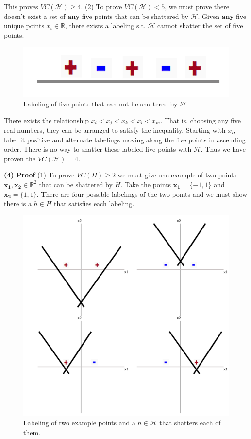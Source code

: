 \documentclass[11pt]{article}
\renewcommand\part[1]{\vspace{.10in}\textbf{(#1)}}
\begin{document}
This proves $VC(\mathcal{H}) \geq 4$. (2) To prove $VC(\mathcal{H}) < 5$, we must prove there doesn't exist a set of \textbf{any} five points that can be shattered by $\mathcal{H}$. Given \textbf{any} five unique points $x_i \in \mathbb{R}$, there exists a labeling s.t. $\mathcal{H}$ cannot shatter the set of five points.

\begin{figure}[H]
  \centerline{\includegraphics[width=0.5\linewidth]{image_2_3_2.png}}
  \caption{Labeling of five points that can not be shattered by $\mathcal{H}$}
\end{figure}

There exists the relationship $x_i < x_j < x_k < x_l < x_m$. That is, choosing any five real numbers, they can be arranged to satisfy the inequality. Starting with $x_i$, label it positive and alternate labelings moving along the five points in ascending order. There is no way to shatter these labeled five points with $\mathcal{H}$. Thus we have proven the $VC(\mathcal{H}) = 4$.


\part{4} \textbf{Proof} (1) To prove $VC(H) \geq 2$ we must give one example of two points $\mathbf{x_1}, \mathbf{x_2} \in \mathbb{R}^2$ that can be shattered by $H$. Take the points $\mathbf{x_1} = \{-1, 1\}$ and $\mathbf{x_2} = \{1, 1\}$. There are four possible labelings of the two points and we must show there is a $h \in H$ that satisfies each labeling.

\begin{figure}[H]
  \centerline{\includegraphics[width=0.5\linewidth]{image_2_4_1.png}}
  \caption{Labeling of two example points and a $h \in \mathcal{H}$ that shatters each of them.}
\end{figure}
\end{document}
